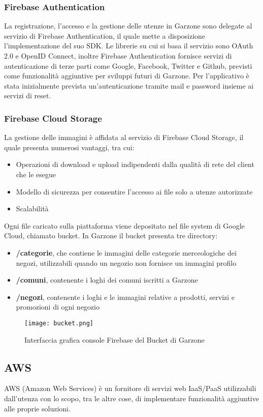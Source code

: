 \subsubsection{Firebase Authentication}
La registrazione, l'accesso e la gestione delle utenze in Garzone sono delegate al servizio di Firebase Authentication, il quale mette a disposizione l'implementazione del suo SDK. Le librerie su cui si basa il servizio sono OAuth 2.0 e OpenID Connect, inoltre Firebase Authentication fornisce servizi di autenticazione di terze parti come Google, Facebook, Twitter e Github, previsti come funzionalità aggiuntive per sviluppi futuri di Garzone. Per l'applicativo è stata inizialmente prevista un'autenticazione tramite mail e password insieme ai servizi di reset. 
\subsubsection{Firebase Cloud Storage}
La gestione delle immagini è affidata al servizio di Firebase Cloud Storage, il quale presenta numerosi vantaggi, tra cui:
\begin{itemize}
  \item Operazioni di download e upload indipendenti dalla qualità di rete del client che le esegue
  \item Modello di sicurezza per consentire l'accesso ai file solo a utenze autorizzate
  \item Scalabilità
\end{itemize}
Ogni file caricato sulla piattaforma viene depositato nel file system di Google Cloud, chiamato bucket. In Garzone il bucket presenta tre directory: 
\begin{itemize}
  \item \textbf{/categorie}, che contiene le immagini delle categorie merceologiche dei negozi, utilizzabili quando un negozio non fornisce un immagini profilo
  \item \textbf{/comuni}, contenente i loghi dei comuni iscritti a Garzone
  \item \textbf{/negozi}, contenente i loghi e le immagini relative a prodotti, servizi e promozioni di ogni negozio
\end{itemize} 
\begin{figure}[h!]
  \centering
  \texttt{[image: bucket.png]}
  \caption{Interfaccia grafica console Firebase del Bucket di Garzone}
\end{figure}
\FloatBarrier
\subsection{AWS}
AWS (Amazon Web Services) è un fornitore di servizi web IaaS/PaaS utilizzabili dall'utenza con lo scopo, tra le altre cose, di implementare funzionalità aggiuntive alle proprie soluzioni.
